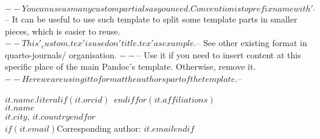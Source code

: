 $-- You can use as many custom partials as you need. Convention is to prefix name with '_'
$-- It can be useful to use such template to split some template parts in smaller pieces, which is easier to reuse. 
$-- This '_custom.tex' is used on 'title.tex' as example.
$-- See other existing format in quarto-journals/ organisation.
$-- %
$-- Use it if you need to insert content at this specific place of the main Pandoc's template. Otherwise, remove it.
$-- Here we are using it to format the authors part of the template.
$-- %

$it.name.literal$$if(it.orcid)$~$endif$$for(it.affiliations)$\\$it.name$\\$it.city$, $it.country$$endfor$\\$if(it.email)$Corresponding author: \href{mailto:$it.email$}{$it.email$}$endif$